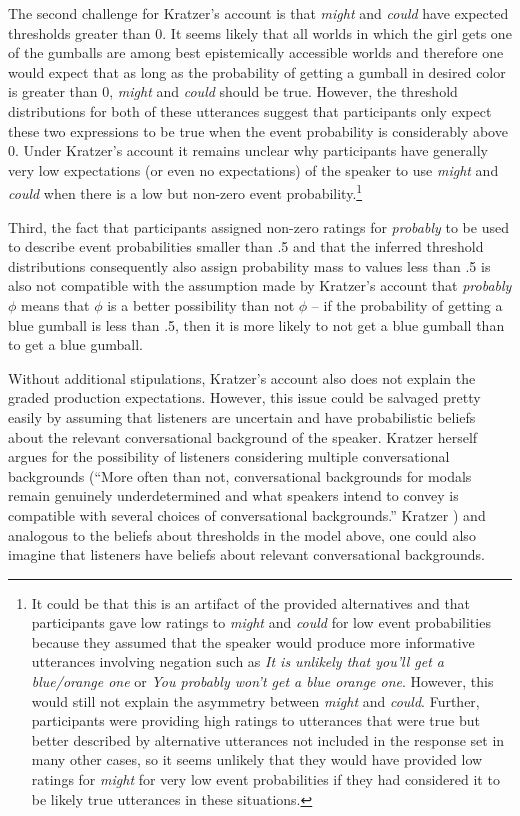 The second challenge for Kratzer's account is that \textit{might} and \textit{could} have expected thresholds greater than 0.
It seems likely that all worlds in which the girl gets one of the gumballs are among best epistemically accessible worlds 
and therefore one would expect that as long as the probability of getting a gumball in desired color is greater than 0, \textit{might} 
and \textit{could} should be true. However, the threshold distributions for both of these utterances suggest that participants only
expect these two expressions to be true when the event probability is considerably above 0. Under Kratzer's account it remains unclear
why participants have generally very low expectations (or even no expectations) of the speaker to use \textit{might} and \textit{could}
when there is a low but non-zero event probability.\footnote{It could be that this is an artifact of the provided alternatives and that participants gave
low ratings to \textit{might} and \textit{could} for low event probabilities because they assumed that the speaker would produce more informative utterances
involving negation such as \emph{It is unlikely that you'll get a blue/orange one} or \emph{You probably won't get a blue orange one}. However, this would still not explain
the asymmetry between \textit{might} and \textit{could}. Further, participants were providing high ratings to utterances that were true but better described by alternative utterances not included
in the response set in many other cases, so it seems unlikely that they would have provided low ratings for \textit{might} for very low event probabilities if they had considered 
it to be likely true utterances in these situations.}

Third, the fact that participants assigned non-zero ratings for \textit{probably} to be used to describe event probabilities smaller than .5 and that the
inferred threshold distributions consequently also assign probability mass to values less than .5 is also not compatible with the assumption made by 
Kratzer's account that \textit{probably} $\phi$ means that $\phi$ is a better possibility than not $\phi$ -- if the probability of getting a blue gumball is less than
.5, then it is more likely to not get a blue gumball than to get a blue gumball.

Without additional stipulations, Kratzer's account also does not explain the graded production expectations. However, this issue could be salvaged pretty easily
by assuming that listeners are uncertain and have probabilistic beliefs about the relevant conversational background of the speaker. Kratzer herself argues for the possibility
of listeners considering multiple conversational backgrounds (``More often than not, conversational backgrounds for modals remain genuinely underdetermined and what speakers intend to convey is compatible with several choices of conversational backgrounds.'' Kratzer \citeyear[][Ch. 2, p. 32]{Kratzer2012}) and analogous to the beliefs about thresholds in the model above, one could also imagine that listeners have
beliefs about relevant conversational backgrounds.

